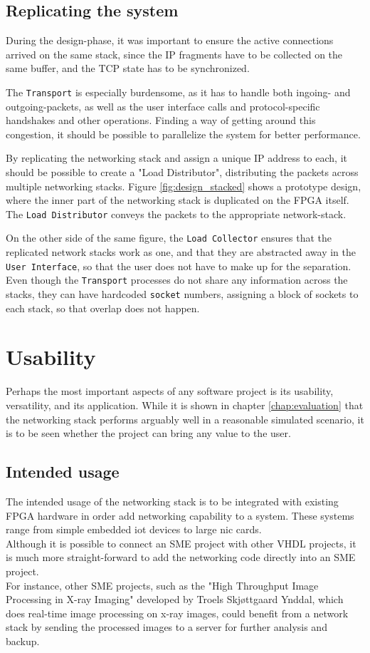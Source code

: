 \subsection{Replicating the system}
During the design-phase, it was important to ensure the active connections
arrived on the same stack, since the IP fragments have to be collected on the
same buffer, and the TCP state has to be synchronized.

The \texttt{Transport} is especially burdensome, as it has to handle both
ingoing- and outgoing-packets, as well as the user interface calls and
protocol-specific handshakes and other operations. Finding a way of getting
around this congestion, it should be possible to parallelize the system for
better performance.

By replicating the networking stack and assign a unique IP address to each, it
should be possible to create a "Load Distributor", distributing the packets
across multiple networking stacks. Figure \ref{fig:design_stacked} shows a
prototype design, where the inner part of the networking stack is duplicated on
the FPGA itself. The \texttt{Load Distributor} conveys the packets to the
appropriate network-stack.

On the other side of the same figure, the \texttt{Load Collector} ensures that
the replicated network stacks work as one, and that they are abstracted away
in the \texttt{User Interface}, so that the user does not have to make up for
the separation. Even though the \texttt{Transport} processes do not share any
information across the stacks, they can have hardcoded \texttt{socket} numbers,
assigning a block of sockets to each stack, so that overlap does not happen.


\section{Usability}
Perhaps the most important aspects of any software project is its usability,
versatility, and its application.
While it is shown in chapter \ref{chap:evaluation} that the networking stack
performs arguably well in a reasonable simulated scenario, it is to be seen
whether the project can bring any value to the user.

\subsection{Intended usage}
The intended usage of the networking stack is to be integrated with existing
FPGA hardware in order add networking capability to a system. These systems
range from simple embedded \gls{iot} devices to large \gls{nic} cards.\\
Although it is possible to connect an SME project with other VHDL projects, it
is much more straight-forward to add the networking code directly into an SME
project.\\
For instance, other SME projects, such as the "High Throughput Image Processing in X-ray
Imaging" developed by Troels Skjøttgaard Ynddal\cite{troels}, which does
real-time image processing on x-ray images, could benefit from a network stack
by sending the processed images to a server for further analysis and backup.

